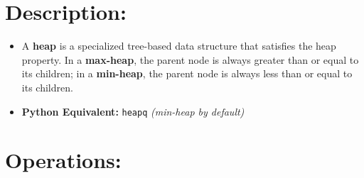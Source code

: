 \documentclass[
  letterpaper,
  DIV=11,
  numbers=noendperiod]{scrreprt}
\providecommand{\tightlist}{%
  \setlength{\itemsep}{0pt}\setlength{\parskip}{0pt}}
\begin{document}
\section{Description:}

\begin{itemize}
\tightlist
\item
  A \textbf{heap} is a specialized tree-based data structure that
  satisfies the heap property. In a \textbf{max-heap}, the parent node
  is always greater than or equal to its children; in a
  \textbf{min-heap}, the parent node is always less than or equal to its
  children.
\item
  \textbf{Python Equivalent:} \texttt{heapq} \emph{(min-heap by
  default)}
\end{itemize}

\section{Operations:}
\end{document}

